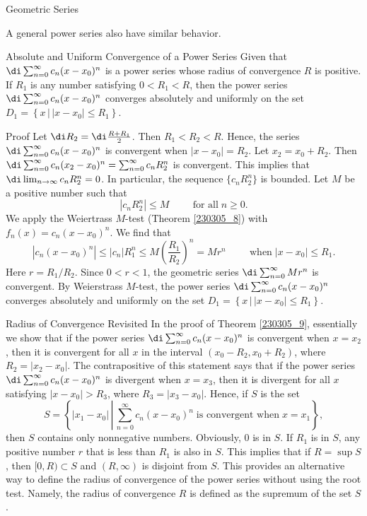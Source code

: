 \begin{example}[label=230305_16]{Geometric Series}
\begin{example}[label=230304_9]{}
A general power series  also have similar behavior.
\begin{theorem}[label=230305_9]{Absolute and Uniform  Convergence of a Power Series}
Given that   $\di \sum_{n=0}^{\infty}c_n(x-x_0)^n$ is a power series whose radius of convergence $R$ is positive. If $R_1$ is any number satisfying $0<R_1<R$, then the power series  $\di \sum_{n=0}^{\infty}c_n(x-x_0)^n$ converges absolutely and uniformly on the set $D_1=\left\{x\,|\,|x-x_0|\leq R_1\right\}$.
\end{theorem}
\begin{myproof}{Proof}
Let $\di R_2=\di \frac{R+R_1}{2}$. Then $R_1<R_2<R$. Hence, the series $\di \sum_{n=0}^{\infty}c_n(x-x_0)^n$  is convergent when $|x-x_0|=R_2$. Let $x_2=x_0+R_2$. Then $\di \sum_{n=0}^{\infty}c_n(x_2-x_0)^n=\sum_{n=0}^{\infty}c_nR_2^n$ is convergent. This implies that
$\di \lim_{n\to\infty}c_nR_2^n=0$.
\bp
In particular, the sequence $\{c_nR_2^n\}$ is bounded. Let $M$ be a positive number such that 
\[|c_nR_2^n|\leq M\hspace{1cm}\text{for all}\;n\geq 0.\]
We apply the Weiertrass $M$-test (Theorem \ref{230305_8}) with $f_n(x)=c_n(x-x_0)^n$. We find that
\[|c_n(x-x_0)^n|\leq |c_n|R_1^n \leq M\left(\frac{R_1}{R_2}\right)^n=Mr^n\hspace{1cm}\text{when}\;|x-x_0|\leq R_1.\]
Here $r=R_1/R_2$. Since $0<r<1$, the geometric series $\di\sum_{n=0}^{\infty} Mr^n$ is convergent. By Weierstrass $M$-test, the power series 
$\di \sum_{n=0}^{\infty}c_n(x-x_0)^n$ converges absolutely and uniformly on the set $D_1=\left\{x\,|\,|x-x_0|\leq R_1\right\}$.\end{myproof}
 
 \begin{remark}{Radius of Convergence Revisited}
In the proof of Theorem \ref{230305_9}, essentially we show that if the power series $\di\sum_{n=0}^{\infty}c_n(x-x_0)^n$ is convergent when $x=x_2$, then it is convergent for all $x$ in the interval $(x_0-R_2, x_0+R_2)$, where $R_2=|x_2-x_0|$. The contrapositive of this statement says that if the power series $\di\sum_{n=0}^{\infty}c_n(x-x_0)^n$  is divergent when $x=x_3$, then it is divergent for all $x$ satisfying $|x-x_0|>R_3$, where $R_3=|x_3-x_0|$. Hence, if 
$S$ is the set
\[S=\left\{|x_1-x_0|\,\left|\, \sum_{n=0}^{\infty}c_n(x-x_0)^n\;\text{is convergent when} \; x=x_1\right.\right\},\]
then $S$ contains only nonnegative numbers. Obviously, 0 is in $S$. If $R_1$ is in $S$,   any positive number $r$ that is less than $R_1$ is also in $S$. This implies that if $R=\sup S$, then $[0, R)\subset S$ and $(R, \infty)$ is disjoint from $S$. This provides an alternative way to define the radius of convergence of the power series without using the root test. Namely, the radius of convergence $R$ is defined as the supremum of the set $S$.
 \end{remark}
 

\end{example}
\end{example}
